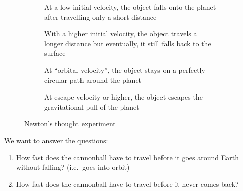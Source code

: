 \begin{figure}[ht]
  \centering
  \begin{subfigure}{.4\textwidth}
    \centering
    \caption{At a low initial velocity, the object falls onto the planet
      after travelling only a short distance}
  \end{subfigure}
  \hspace{.3in}
  \begin{subfigure}{.4\textwidth}
    \centering
    \caption{With a higher initial velocity, the object travels a longer
      distance but eventually, it still falls back to the surface}
  \end{subfigure}
  
  \begin{subfigure}{.4\textwidth}
    \centering
    \caption{At ``orbital velocity'', the object stays on a perfectly circular
      path around the planet}%
    \label{fig:in-orbit}
  \end{subfigure}
  \hspace{.3in}
  \begin{subfigure}{.4\textwidth}
    \centering
    \caption{At escape velocity or higher, the object escapes the gravitational
      pull of the planet}
    \label{fig:escape-from-orbit}
  \end{subfigure}
  \caption{Newton's thought experiment}
  \label{fig:thought-experiment}
\end{figure}
We want to answer the questions:
\begin{enumerate}
\item How fast does the cannonball have to travel before it goes around Earth
  without falling? (i.e.\ goes into orbit)
\item How fast does the cannonball have to travel before it never comes back?
\end{enumerate}



